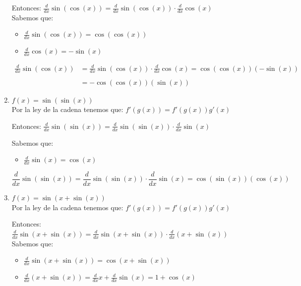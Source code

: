 \documentclass[12pt]{article}
\begin{document}
\begin{enumerate}[\hspace{9px} a)]
        Entonces: \quad \(\displaystyle\frac{d}{dx}\sin(\cos(x))=\displaystyle\frac{d}{dx}\sin(\cos(x))\cdot\frac{d}{dx}\cos(x)\)\\

        Sabemos que:
        \begin{itemize}
            \item \(\displaystyle\frac{d}{dx}\sin(\cos(x))=\cos(\cos(x))\)
            \item \(\displaystyle\frac{d}{dx}\cos(x)=-\sin(x)\)
        \end{itemize}

        \begin{align*}
            \displaystyle\frac{d}{dx}\sin(\cos(x))&=\frac{d}{dx}\sin(\cos(x))\cdot\frac{d}{dx}\cos(x)=\cos(\cos(x))(-\sin(x))\\ \\
            &=-\cos(\cos(x))(\sin(x))
        \end{align*}
    \item \(f(x) = \sin(\sin(x))\)\\

        Por la ley de la cadena tenemos que: \(f'(g(x))=f'(g(x))g'(x)\)\medskip

        Entonces: \quad \(\displaystyle\frac{d}{dx}\sin(\sin(x))=\displaystyle\frac{d}{dx}\sin(\sin(x))\cdot\displaystyle\frac{d}{dx}\sin(x)\)\medskip

        Sabemos que:
        \begin{itemize}
            \item \(\displaystyle\frac{d}{dx}\sin(x)=\cos(x)\)
        \end{itemize}

        \[\displaystyle\frac{d}{dx}\sin(\sin(x))=\displaystyle\frac{d}{dx}\sin(\sin(x))\cdot\displaystyle\frac{d}{dx}\sin(x)=\cos(\sin(x))(\cos(x))\]
    \item \(f(x) = \sin(x+\sin(x))\)\\

        Por la ley de la cadena tenemos que: \(f'(g(x))=f'(g(x))g'(x)\)\medskip

        Entonces: \quad \(\displaystyle\frac{d}{dx}\sin(x+\sin(x))=\frac{d}{dx}\sin(x+\sin(x))\cdot\frac{d}{dx}(x+\sin(x))\)\\

        Sabemos que:
        \begin{itemize}
            \item \(\displaystyle\frac{d}{dx}\sin(x+\sin(x))=\cos(x+\sin(x))\)
            \item \(\displaystyle\frac{d}{dx}(x+\sin(x))=\frac{d}{dx}x+\frac{d}{dx}\sin(x)=1+\cos(x)\)
        \end{itemize}


\end{enumerate}
\end{document}
